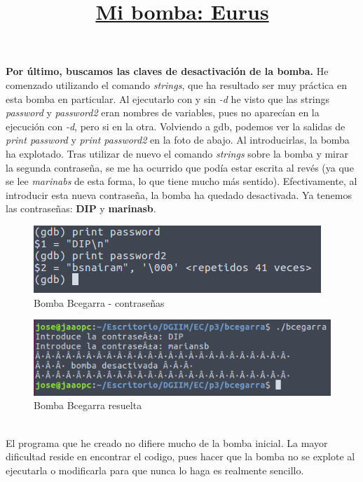 \documentclass[11pt,a4paper]{article}
\begin{document}
\textbf{Por último, buscamos las claves de desactivación de la bomba.} He comenzado utilizando el comando \emph{strings}, que ha resultado ser muy práctica en esta bomba en particular. Al ejecutarlo con y sin \emph{-d} he visto que las strings \emph{password} y \emph{password2} eran nombres de variables, pues no aparecían en la ejecución con \emph{-d}, pero si en la otra.
Volviendo a gdb, podemos ver la salidas de \emph{print password} y \emph{print password2} en la foto de abajo. Al introducirlas, la bomba ha explotado. Tras utilizar de nuevo el comando \emph{strings} sobre la bomba y mirar la segunda contraseña, se me ha ocurrido que podía estar escrita al revés (ya que se lee \emph{marinabs} de esta forma, lo que tiene mucho más sentido). Efectivamente, al introducir esta nueva contraseña, la bomba ha quedado desactivada.
Ya tenemos las contraseñas: \textbf{DIP} y \textbf{marinasb}. \\


\begin{figure}[H] 
	\centering
	\includegraphics[scale=0.45]{capturas/bcegarraContras.png} 
	\caption{Bomba Bcegarra - contraseñas} \label{fig:figura25}
\end{figure}

\begin{figure}[H] 
	\centering
	\includegraphics[scale=0.45]{capturas/bcegarra3.png} 
	\caption{Bomba Bcegarra resuelta} \label{fig:figura25}
\end{figure}

\title{\large{\textbf{\underline{Mi bomba: Eurus}}}} \\

El programa que he creado no difiere mucho de la bomba inicial. La mayor dificultad reside en encontrar el codigo, pues hacer que la bomba no se explote al ejecutarla o modificarla para que nunca lo haga es realmente sencillo. \\
\end{document}
